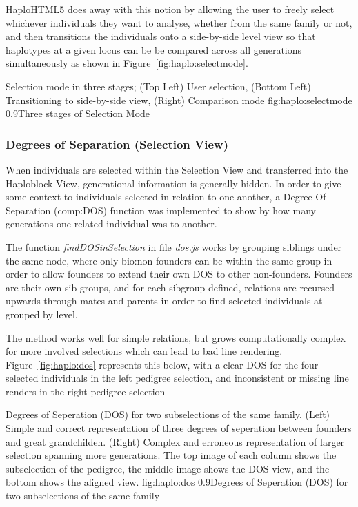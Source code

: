 HaploHTML5 does away with this notion by allowing the user to freely select whichever individuals they want to analyse, whether from the same family or not, and then transitions the individuals onto a side-by-side level view so that haplotypes at a given locus can be be compared across all generations simultaneously as shown in Figure~\ref{fig:haplo:selectmode}.

	{Selection mode in three stages; (Top Left) User selection, (Bottom Left) Transitioning to side-by-side view, (Right) Comparison mode}
	{fig:haplo:selectmode}
	{0.9}{Three stages of Selection Mode}


\subsubsection{Degrees of Separation (Selection View)}\label{ref:haplo:dos}

When individuals are selected within the Selection View and transferred into the Haploblock View, generational information is generally hidden. In order to give some context to individuals selected in relation to one another, a Degree-Of-Separation (\gls{comp:DOS}) function was implemented to show by how many generations one related individual was to another.

The function \textit{findDOSinSelection} in file \textit{dos.js} works by grouping siblings under the same node, where only \gls{bio:non-founders} can be within the same group in order to allow founders to extend their own DOS to other non-founders. Founders are their own sib groups, and for each sibgroup defined, relations are recursed upwards through mates and parents in order to find selected individuals at grouped by level.

The method works well for simple relations, but grows computationally complex for more involved selections which can lead to bad line rendering. Figure~\ref{fig:haplo:dos} represents this below, with a clear DOS for the four selected individuals in the left pedigree selection, and inconsistent or missing line renders in the right pedigree selection

	{Degrees of Seperation (DOS) for two subselections of the same family. (Left) Simple and correct representation of three degrees of seperation between founders and great grandchilden. (Right) Complex and erroneous representation of larger selection spanning more generations. The top image of each column shows the subselection of the pedigree, the middle image shows the DOS view, and the bottom shows the aligned view.}
	{fig:haplo:dos}
	{0.9}{Degrees of Seperation (DOS) for two subselections of the same family}
	
